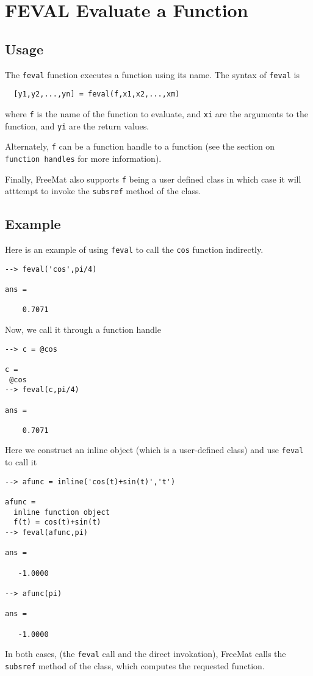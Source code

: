 \section{FEVAL Evaluate a Function}

\subsection{Usage}

The \verb|feval| function executes a function using its name.
The syntax of \verb|feval| is
\begin{verbatim}
  [y1,y2,...,yn] = feval(f,x1,x2,...,xm)
\end{verbatim}
where \verb|f| is the name of the function to evaluate, and
\verb|xi| are the arguments to the function, and \verb|yi| are the
return values.

Alternately, \verb|f| can be a function handle to a function
(see the section on \verb|function handles| for more information).

Finally, FreeMat also supports \verb|f| being a user defined class
in which case it will atttempt to invoke the \verb|subsref| method
of the class.
\subsection{Example}

Here is an example of using \verb|feval| to call the \verb|cos| 
function indirectly.
\begin{verbatim}
--> feval('cos',pi/4)

ans = 

    0.7071 
\end{verbatim}
Now, we call it through a function handle
\begin{verbatim}
--> c = @cos

c = 
 @cos
--> feval(c,pi/4)

ans = 

    0.7071 
\end{verbatim}
Here we construct an inline object (which is a user-defined class)
and use \verb|feval| to call it
\begin{verbatim}
--> afunc = inline('cos(t)+sin(t)','t')

afunc = 
  inline function object
  f(t) = cos(t)+sin(t)
--> feval(afunc,pi)

ans = 

   -1.0000 

--> afunc(pi)

ans = 

   -1.0000 
\end{verbatim}
In both cases, (the \verb|feval| call and the direct invokation), FreeMat
calls the \verb|subsref| method of the class, which computes the requested 
function.
